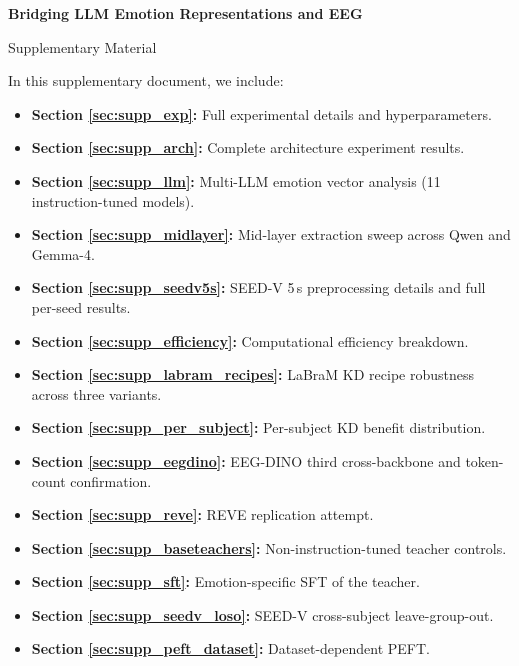 \setcounter{page}{1}

\renewcommand{\thefigure}{S\arabic{figure}}
\setcounter{figure}{0}
\renewcommand{\thesection}{S\arabic{section}}
\setcounter{section}{0}
\renewcommand{\thetable}{S\arabic{table}}
\setcounter{table}{0}

\begin{center}
\Large\textbf{Bridging LLM Emotion Representations and EEG}\par
\vspace{0.5em}
\Large Supplementary Material
\end{center}

\noindent In this supplementary document, we include:
\begin{itemize}
    \item \textbf{Section \ref{sec:supp_exp}:} Full experimental details and hyperparameters.
    \item \textbf{Section \ref{sec:supp_arch}:} Complete architecture experiment results.
    \item \textbf{Section \ref{sec:supp_llm}:} Multi-LLM emotion vector analysis (11 instruction-tuned models).
    \item \textbf{Section \ref{sec:supp_midlayer}:} Mid-layer extraction sweep across Qwen and Gemma-4.
    \item \textbf{Section \ref{sec:supp_seedv5s}:} SEED-V 5\,s preprocessing details and full per-seed results.
    \item \textbf{Section \ref{sec:supp_efficiency}:} Computational efficiency breakdown.
    \item \textbf{Section \ref{sec:supp_labram_recipes}:} LaBraM KD recipe robustness across three variants.
    \item \textbf{Section \ref{sec:supp_per_subject}:} Per-subject KD benefit distribution.
    \item \textbf{Section \ref{sec:supp_eegdino}:} EEG-DINO third cross-backbone and token-count confirmation.
    \item \textbf{Section \ref{sec:supp_reve}:} REVE replication attempt.
    \item \textbf{Section \ref{sec:supp_baseteachers}:} Non-instruction-tuned teacher controls.
    \item \textbf{Section \ref{sec:supp_sft}:} Emotion-specific SFT of the teacher.
    \item \textbf{Section \ref{sec:supp_seedv_loso}:} SEED-V cross-subject leave-group-out.
    \item \textbf{Section \ref{sec:supp_peft_dataset}:} Dataset-dependent PEFT.

\end{itemize}
